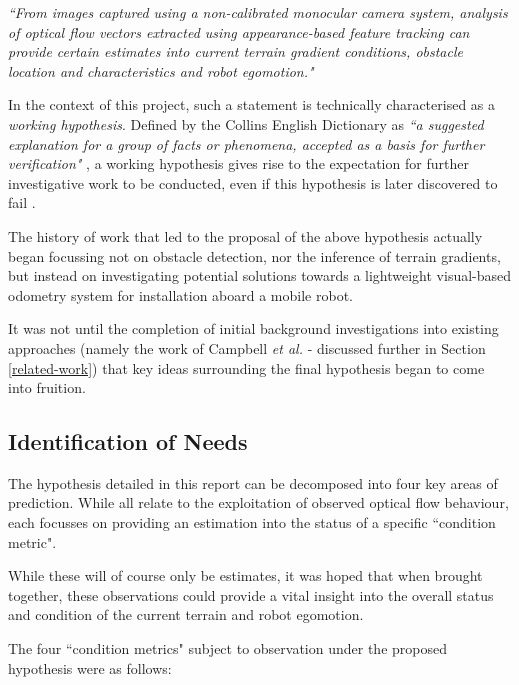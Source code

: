 \indent \textit{``From images captured using a non-calibrated monocular camera system, analysis of optical flow vectors extracted using appearance-based feature tracking can provide certain estimates into current terrain gradient conditions, obstacle location and characteristics and robot egomotion."}
 
In the context of this project, such a statement is technically characterised as a \textit{working hypothesis}. Defined by the Collins English Dictionary as \textit{``a suggested explanation for a group of facts or phenomena, accepted as a basis for further verification"} \cite{collins}, a working hypothesis gives rise to the expectation for further investigative work to be conducted, even if this hypothesis is later discovered to fail \cite{century}. 

The history of work that led to the proposal of the above hypothesis actually began focussing not on obstacle detection, nor the inference of terrain gradients, but instead on investigating potential solutions towards a lightweight visual-based odometry system for installation aboard a mobile robot. 

It was not until the completion of initial background investigations into existing approaches (namely the work of Campbell \textit{et al.} \cite{campbell} - discussed further in Section \ref{related-work}) that key ideas surrounding the final hypothesis began to come into fruition. 

\subsection{Identification of Needs}

The hypothesis detailed in this report can be decomposed into four key areas of prediction. While all relate to the exploitation of observed optical flow behaviour, each focusses on providing an estimation into the status of a specific ``condition metric". 

While these will of course only be estimates, it was hoped that when brought together, these observations could provide a vital insight into the overall status and condition of the current terrain and robot egomotion. 

The four ``condition metrics" subject to observation under the proposed hypothesis were as follows:


